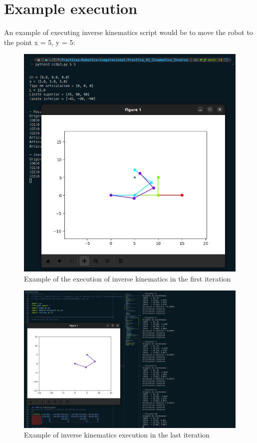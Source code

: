\documentclass[11pt]{report}
\begin{document}
\newpage

\section{Example execution}
An example of executing inverse kinematics script would be to move the robot to the point x = 5, y = 5:
\begin{figure}[H]
  \centering
  \includegraphics[scale=0.35]{img/ejemplo_ci_1.png}
  \caption{Example of the execution of inverse kinematics in the first iteration}
\end{figure}

\begin{figure}[H]
  \centering
  \includegraphics[scale=0.25]{img/ejemplo_ci_2.png}
  \caption{Example of inverse kinematics execution in the last iteration}
\end{figure}
\end{document}
